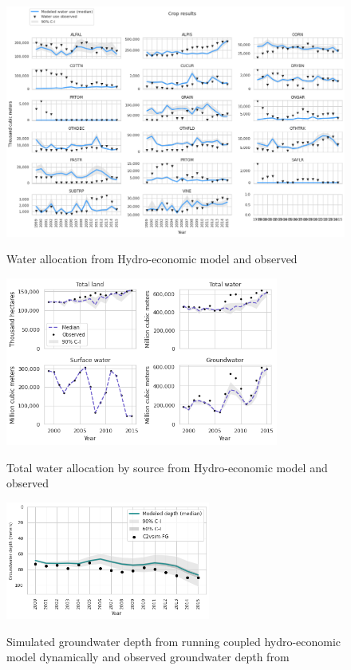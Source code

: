 \documentclass[11pt,a4paper]{article}
\begin{document}
\begin{figure}[H]
\centering
\includegraphics[width=1\textwidth]{./figs/water_use.png}
\label{fig:mesh1}
\caption{Water allocation from Hydro-economic model and observed}
\end{figure}

\begin{figure}[H]
\centering
\includegraphics[width=0.8\textwidth]{./figs/water_use_by_source.png}
\label{fig:mesh1}
\caption{Total water allocation by source from Hydro-economic model and observed}
\end{figure}

\begin{figure}[H]
\centering
\includegraphics[width=0.6\textwidth]{./figs/gw_depth.png}
\label{fig:mesh1}
\caption{Simulated groundwater depth from running coupled hydro-economic model dynamically  and observed groundwater depth from \textcite{dwr_c2vsimfg_2021}}
\end{figure}
\end{document}
